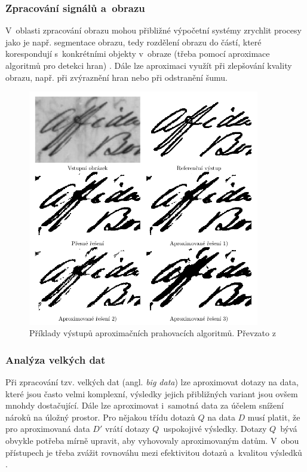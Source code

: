 \subsubsection{Zpracování signálů a~obrazu}
V~oblasti zpracování obrazu mohou přibližné výpočetní systémy zrychlit procesy jako je např. segmentace obrazu, tedy rozdělení obrazu do částí, které korespondují s~konkrétními objekty v~obraze (třeba pomocí aproximace algoritmů pro detekci hran) \cite{segmentation_tech}. Dále lze aproximaci využít při zlepšování kvality obrazu, např. při zvýraznění hran nebo při odstranění šumu.

\begin{figure}[H]
    \centering
    \includegraphics[width=0.9\textwidth]{obrazky-figures/approx_thresholding.png}
    \caption{Příklady výstupů aproximačních prahovacích algoritmů. Převzato z~\cite{approx_image}}
    \label{fig:approx_threshold}
\end{figure}

\subsubsection{Analýza velkých dat}
Při zpracování tzv. velkých dat (angl. \textit{big data}) lze aproximovat dotazy na data, které jsou často velmi komplexní, výsledky jejich přibližných variant jsou ovšem mnohdy dostačující. Dále lze aproximovat i~samotná data za účelem snížení nároků na úložný prostor. Pro nějakou třídu dotazů $Q$ na data $D$ musí platit, že pro aproximovaná data $D'$ vrátí dotazy $Q$~uspokojivé výsledky. Dotazy $Q$~bývá obvykle potřeba mírně upravit, aby vyhovovaly aproximovaným datům. V~obou přístupech je třeba zvážit rovnováhu mezi efektivitou dotazů a~kvalitou výsledků \cite{approx_big_data}.

